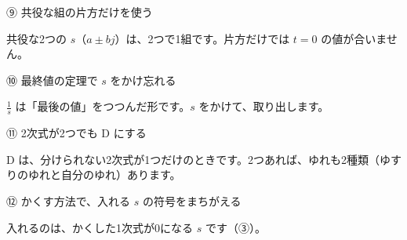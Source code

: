 \begingroup{}%
\noindent\begin{minipage}[t]{0.485\linewidth}\vspace{0pt}
\begin{tsumazuki}{⑨ 共役な組の片方だけを使う}
\raggedright{}
共役な2つの $s$（$a\pm bj$）は、2つで1組です。片方だけでは $t=0$ の値が合いません。
\end{tsumazuki}
\end{minipage}\hfill
\begin{minipage}[t]{0.485\linewidth}\vspace{0pt}
\begin{tsumazuki}{⑩ 最終値の定理で $s$ をかけ忘れる}
\raggedright{}
$\frac1s$ は「最後の値」をつつんだ形です。$s$ をかけて、取り出します。
\end{tsumazuki}
\end{minipage}\par
\endgroup

\par\vspace{4pt}
\begingroup{}%
\noindent\begin{minipage}[t]{0.485\linewidth}\vspace{0pt}
\begin{tsumazuki}{⑪ 2次式が2つでも D にする}
\raggedright{}
D は、分けられない2次式が1つだけのときです。2つあれば、ゆれも2種類（ゆすりのゆれと自分のゆれ）あります。
\end{tsumazuki}
\end{minipage}\hfill
\begin{minipage}[t]{0.485\linewidth}\vspace{0pt}
\begin{tsumazuki}{⑫ かくす方法で、入れる $s$ の符号をまちがえる}
\raggedright{}
入れるのは、かくした1次式が0になる $s$ です（③）。
\end{tsumazuki}
\end{minipage}\par
\endgroup






